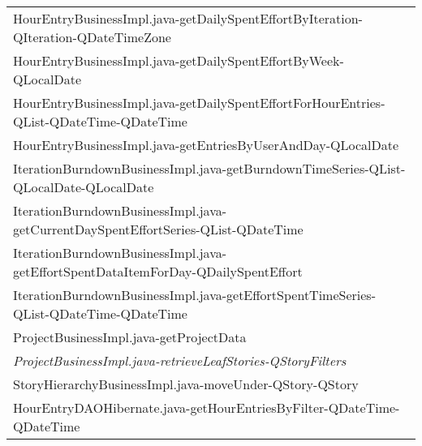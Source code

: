 \begin{table}[t!]
\begin{tabular}{@{\hspace{2pt}}l@{\hspace{2pt}}}
     HourEntryBusinessImpl.java-getDailySpentEffortByIteration-QIteration-QDateTimeZone                              \\%
     HourEntryBusinessImpl.java-getDailySpentEffortByWeek-QLocalDate                                            \\%
     HourEntryBusinessImpl.java-getDailySpentEffortForHourEntries-QList-QDateTime-QDateTime          \\%
     HourEntryBusinessImpl.java-getEntriesByUserAndDay-QLocalDate                                               \\%
     IterationBurndownBusinessImpl.java-getBurndownTimeSeries-QList-QLocalDate-QLocalDate \\%
     IterationBurndownBusinessImpl.java-getCurrentDaySpentEffortSeries-QList-QDateTime                \\%
     IterationBurndownBusinessImpl.java-getEffortSpentDataItemForDay-QDailySpentEffort                                \\%
     IterationBurndownBusinessImpl.java-getEffortSpentTimeSeries-QList-QDateTime-QDateTime           \\%
     ProjectBusinessImpl.java-getProjectData                                                                         \\%
     \emph{ProjectBusinessImpl.java-retrieveLeafStories-QStoryFilters}                                                     \\%
     StoryHierarchyBusinessImpl.java-moveUnder-QStory-QStory                                                         \\%
     HourEntryDAOHibernate.java-getHourEntriesByFilter-QDateTime-QDateTime                                         \\%

\end{tabular}
\end{table}
